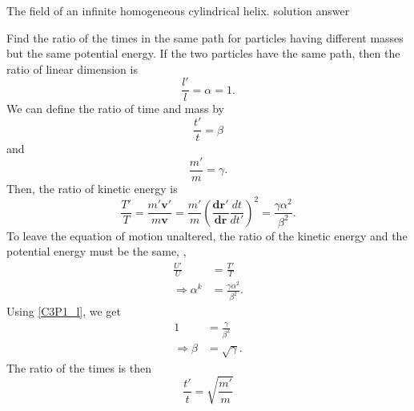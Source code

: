 \begin{subproblem}
{
The field of an infinite homogeneous cylindrical helix.
}
{
solution
}
{
answer
}
\end{subproblem}


\begin{problem}
{
Find the ratio of the times in the same path for particles having different masses but the same potential energy.
}
{
If the two particles have the same path, then the ratio of linear dimension is
\begin{equation} \label{C3P1_l}
    \frac{l'}{l} = \alpha = 1.
\end{equation}
We can define the ratio of time and mass by
\begin{equation*}
    \frac{t'}{t} = \beta
\end{equation*}
and
\begin{equation*}
    \frac{m'}{m} = \gamma .
\end{equation*}
Then, the ratio of kinetic energy is 
\begin{equation*}
    \frac{T'}{T} = \frac{m' \mathbf{v}'}{m \mathbf{v}} = \frac{m'}{m} \left( \frac{\mathbf{dr}'}{\mathbf{dr}} \frac{dt}{dt'} \right)^2 = \frac{\gamma \alpha^2}{\beta^2}.
\end{equation*}
To leave the equation of motion unaltered, the ratio of the kinetic energy and the potential energy must be the same, \ie,
\begin{align*}
    \frac{U'}{U} &= \frac{T'}{T} \\
    \Rightarrow \alpha^k &=  \frac{\gamma \alpha^2}{\beta^2}.
\end{align*}
Using \eqref{C3P1_l}, we get
\begin{align*}
    1 &= \frac{\gamma}{\beta^2} \\
    \Rightarrow \beta &= \sqrt{\gamma}.
\end{align*}
The ratio of the times is then
}
{
\begin{equation*}
    \frac{t'}{t} = \sqrt{\frac{m'}{m}}
\end{equation*}
}
\end{problem}


